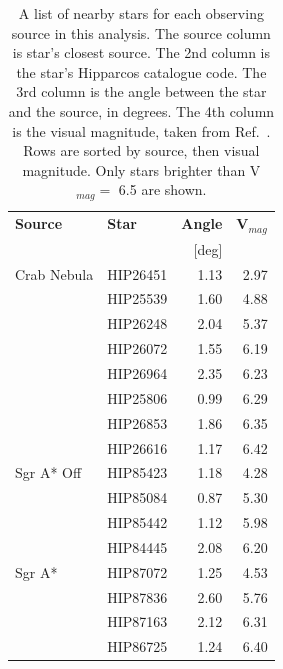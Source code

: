     \begin{table}[t]
      \centering
      \begin{tabular}{|l|l|r|r|}
        \hline
        \textbf{Source} & \textbf{Star} & \textbf{Angle} & \textbf{V${}_{mag}$} \\ 
                        &               & [deg]             &                      \\
        \hline
        Crab Nebula & HIP26451 & 1.13 & 2.97 \\
                    & HIP25539 & 1.60 & 4.88 \\
                    & HIP26248 & 2.04 & 5.37 \\
                    & HIP26072 & 1.55 & 6.19 \\
                    & HIP26964 & 2.35 & 6.23 \\
                    & HIP25806 & 0.99 & 6.29 \\
                    & HIP26853 & 1.86 & 6.35 \\
                    & HIP26616 & 1.17 & 6.42 \\
        \hline
        Sgr A* Off  & HIP85423 & 1.18 & 4.28 \\
                    & HIP85084 & 0.87 & 5.30 \\
                    & HIP85442 & 1.12 & 5.98 \\
                    & HIP84445 & 2.08 & 6.20 \\
        \hline
        Sgr A*      & HIP87072 & 1.25 & 4.53 \\
                    & HIP87836 & 2.60 & 5.76 \\
                    & HIP87163 & 2.12 & 6.31 \\
                    & HIP86725 & 1.24 & 6.40 \\
        \hline
      \end{tabular}
      \caption[Bright Stars in the Fields of View]{
        A list of nearby stars for each observing source in this analysis.
        The source column is star's closest source.
        The 2nd column is the star's Hipparcos catalogue code.
        The 3rd column is the angle between the star and the source, in degrees.
        The 4th column is the visual magnitude, taken from Ref.~\cite{hipparcos_catalogue}.
        Rows are sorted by source, then visual magnitude.
        Only stars brighter than V${}_{mag}=$ 6.5 are shown.
      }
      \label{tab:brightstars}
    \end{table}

